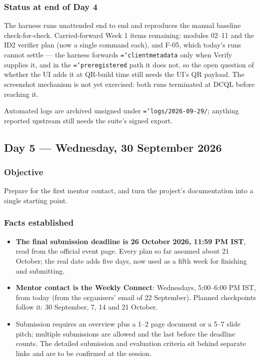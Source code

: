 \documentclass[11pt,a4paper]{article}
\newcommand{\tightlist}{\setlength{\itemsep}{0pt}\setlength{\parskip}{0pt}\setlength{\parsep}{0pt}}
\let\origtexttt\texttt
\renewcommand{\texttt}[1]{\origtexttt{\hyphenchar\font=`\-\relax #1}}
\renewcommand{\_}{\textunderscore\allowbreak}
\begin{document}
\subsubsection*{Status at end of Day 4}
The harness runs unattended end to end and reproduces the manual baseline check-for-check.
Carried-forward Week 1 items remaining: modules 02--11 and the ID2 verifier plan (now a
single command each), and F-05, which today's runs cannot settle --- the harness forwards
\texttt{client\_metadata} only when Verify supplies it, and in the \texttt{pre\_registered}
path it does not, so the open question of whether the UI adds it at QR-build time still
needs the UI's QR payload. The screenshot mechanism is not yet exercised: both runs
terminated at DCQL before reaching it.

Automated logs are archived unsigned under \texttt{logs/2026-09-29/}; anything reported
upstream still needs the suite's signed export.

\subsection{Day 5 --- Wednesday, 30 September 2026}

\subsubsection*{Objective}
Prepare for the first mentor contact, and turn the project's documentation into a single
starting point.

\subsubsection*{Facts established}
\begin{itemize}\tightlist
  \item \textbf{The final submission deadline is 26 October 2026, 11:59 PM IST}, read from
        the official event page. Every plan so far assumed about 21 October; the real date
        adds five days, now used as a fifth week for finishing and submitting.
  \item \textbf{Mentor contact is the Weekly Connect}: Wednesdays, 5:00--6:00 PM IST, from
        today (from the organisers' email of 22 September). Planned checkpoints follow it:
        30 September, 7, 14 and 21 October.
  \item Submission requires an overview plus a 1--2 page document or a 5--7 slide pitch;
        multiple submissions are allowed and the last before the deadline counts. The
        detailed submission and evaluation criteria sit behind separate links and are to
        be confirmed at the session.
\end{itemize}
\end{document}
